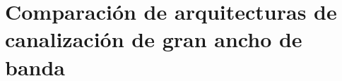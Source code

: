 \documentclass[ignorenonframetext,12pt]{beamer}
\begin{document}
\section{Comparación de arquitecturas de canalización de gran ancho de banda}
\end{document}
